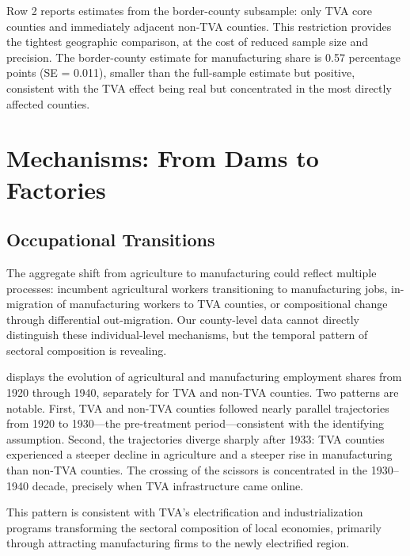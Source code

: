 \documentclass[12pt]{article}
\begin{document}
 Row 2 reports estimates from the border-county subsample: only TVA core counties and immediately adjacent non-TVA counties. This restriction provides the tightest geographic comparison, at the cost of reduced sample size and precision. The border-county estimate for manufacturing share is 0.57 percentage points (SE = 0.011), smaller than the full-sample estimate but positive, consistent with the TVA effect being real but concentrated in the most directly affected counties.


\section{Mechanisms: From Dams to Factories}\label{sec:mechanisms}

\subsection{Occupational Transitions}

The aggregate shift from agriculture to manufacturing could reflect multiple processes: incumbent agricultural workers transitioning to manufacturing jobs, in-migration of manufacturing workers to TVA counties, or compositional change through differential out-migration. Our county-level data cannot directly distinguish these individual-level mechanisms, but the temporal pattern of sectoral composition is revealing.

 displays the evolution of agricultural and manufacturing employment shares from 1920 through 1940, separately for TVA and non-TVA counties. Two patterns are notable. First, TVA and non-TVA counties followed nearly parallel trajectories from 1920 to 1930---the pre-treatment period---consistent with the identifying assumption. Second, the trajectories diverge sharply after 1933: TVA counties experienced a steeper decline in agriculture and a steeper rise in manufacturing than non-TVA counties. The crossing of the scissors is concentrated in the 1930--1940 decade, precisely when TVA infrastructure came online.

This pattern is consistent with TVA's electrification and industrialization programs transforming the sectoral composition of local economies, primarily through attracting manufacturing firms to the newly electrified region.
\end{document}
